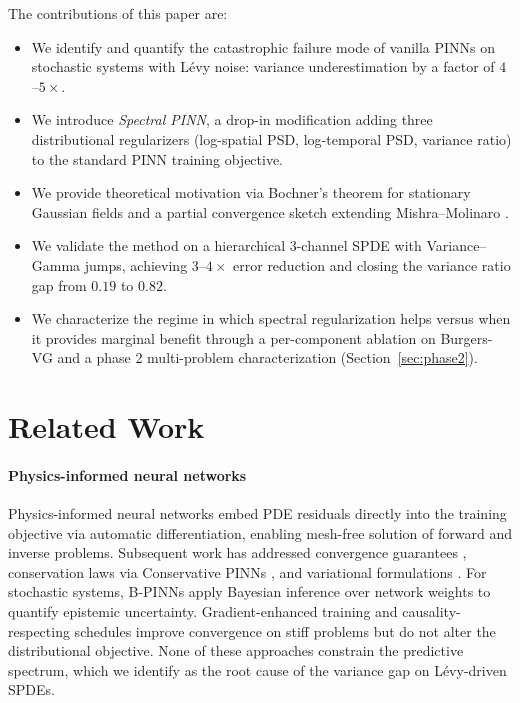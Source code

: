 \documentclass[times,12pt]{elsarticle}
\begin{document}
The contributions of this paper are:
\begin{itemize}
    \item We identify and quantify the catastrophic failure mode of vanilla PINNs on stochastic systems with L\'evy noise: variance underestimation by a factor of $4$--$5\times$.
    \item We introduce \emph{Spectral PINN}, a drop-in modification adding three distributional regularizers (log-spatial PSD, log-temporal PSD, variance ratio) to the standard PINN training objective.
    \item We provide theoretical motivation via Bochner's theorem for stationary Gaussian fields and a partial convergence sketch extending Mishra--Molinaro \cite{MishraMolinaro2022}.
    \item We validate the method on a hierarchical 3-channel SPDE with Variance--Gamma jumps, achieving $3$--$4\times$ error reduction and closing the variance ratio gap from $0.19$ to $0.82$.
    \item We characterize the regime in which spectral regularization helps versus when it provides marginal benefit through a per-component ablation on Burgers-VG and a phase 2 multi-problem characterization (Section~\ref{sec:phase2}).
\end{itemize}


\section{Related Work}
\label{sec:related-work}

\paragraph{Physics-informed neural networks}
Physics-informed neural networks \cite{Raissi2019} embed PDE residuals directly
into the training objective via automatic differentiation, enabling mesh-free
solution of forward and inverse problems. Subsequent work has addressed
convergence guarantees \cite{MishraMolinaro2022}, conservation laws via
Conservative PINNs \cite{Jagtap2020}, and variational formulations
\cite{Kharazmi2019}. For stochastic systems, B-PINNs \cite{YangMengKarniadakis2021}
apply Bayesian inference over network weights to quantify epistemic uncertainty.
Gradient-enhanced training \cite{Wang2022} and causality-respecting schedules
\cite{Wang2024Causal} improve convergence on stiff problems but do not alter
the distributional objective. None of these approaches constrain the predictive
spectrum, which we identify as the root cause of the variance gap on L\'evy-driven
SPDEs.
\end{document}
